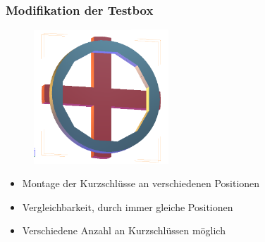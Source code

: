\documentclass[accentcolor=tud9b, colorbacktitle, inverttitle]{tudbeamer}
\begin{document}
\begin{frame}\frametitle{Modifikation der Testbox}
\begin{multicols}{2}
\vspace{-2em}
	\begin{figure}[h]
		\centering
		\includegraphics[width=0.45\textwidth]{halterung}
	\end{figure}
	\vfill\null
	\columnbreak
	\begin{itemize}
		\item Montage der Kurzschl\"usse an verschiedenen Positionen 
		\item Vergleichbarkeit, durch immer gleiche Positionen
		\item Verschiedene Anzahl an Kurzschl\"ussen m\"oglich
	\end{itemize}

\end{multicols}
\end{frame}

% 	 
\end{document}
